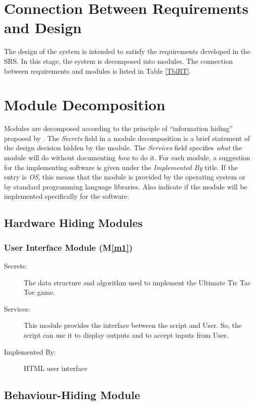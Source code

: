 \documentclass[12pt, titlepage]{article}
\newcommand{\mref}[1]{M\ref{#1}}
\begin{document}
\section{Connection Between Requirements and Design} \label{SecConnection}

The design of the system is intended to satisfy the requirements developed in
the SRS. In this stage, the system is decomposed into modules. The connection
between requirements and modules is listed in Table \ref{TblRT}.

\section{Module Decomposition} \label{SecMD}

Modules are decomposed according to the principle of ``information hiding''
proposed by \citet{ParnasEtAl1984}. The \emph{Secrets} field in a module
decomposition is a brief statement of the design decision hidden by the
module. The \emph{Services} field specifies \emph{what} the module will do
without documenting \emph{how} to do it. For each module, a suggestion for the
implementing software is given under the \emph{Implemented By} title. If the
entry is \emph{OS}, this means that the module is provided by the operating
system or by standard programming language libraries.  Also indicate if the
module will be implemented specifically for the software.

\subsection{Hardware Hiding Modules}
\subsubsection{User Interface Module (\mref{m1})}
\begin{description}
\item[Secrets:]The data structure and algorithm used to implement the Ultimate Tic Tac Toe game.
\item[Services:]This module provides the interface between the script and User. So, the script can use it to display outputs and to accept inputs from User.
\item[Implemented By:] HTML user interface
\end{description}

\subsection{Behaviour-Hiding Module}
\end{document}
